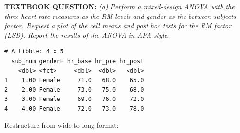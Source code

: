 \documentclass[]{article}
\newenvironment{Shaded}{\begin{snugshade}}{\end{snugshade}}
\newcommand{\KeywordTok}[1]{\textcolor[rgb]{0.13,0.29,0.53}{\textbf{#1}}}
\newcommand{\DataTypeTok}[1]{\textcolor[rgb]{0.13,0.29,0.53}{#1}}
\newcommand{\DecValTok}[1]{\textcolor[rgb]{0.00,0.00,0.81}{#1}}
\newcommand{\StringTok}[1]{\textcolor[rgb]{0.31,0.60,0.02}{#1}}
\newcommand{\CommentTok}[1]{\textcolor[rgb]{0.56,0.35,0.01}{\textit{#1}}}
\newcommand{\OperatorTok}[1]{\textcolor[rgb]{0.81,0.36,0.00}{\textbf{#1}}}
\newcommand{\NormalTok}[1]{#1}
\begin{document}
\textbf{TEXTBOOK QUESTION:} \emph{(a) Perform a mixed-design ANOVA with
the three heart-rate measures as the RM levels and gender as the
between-subjects factor. Request a plot of the cell means and post hoc
tests for the RM factor (LSD). Report the results of the ANOVA in APA
style.}

\begin{Shaded}
\end{Shaded}

\begin{verbatim}
# A tibble: 4 x 5
  sub_num genderF hr_base hr_pre hr_post
    <dbl> <fct>     <dbl>  <dbl>   <dbl>
1    1.00 Female     71.0   68.0    65.0
2    2.00 Female     73.0   75.0    68.0
3    3.00 Female     69.0   76.0    72.0
4    4.00 Female     72.0   73.0    78.0
\end{verbatim}

Restructure from wide to long format:

\begin{Shaded}
\end{Shaded}
\end{document}
